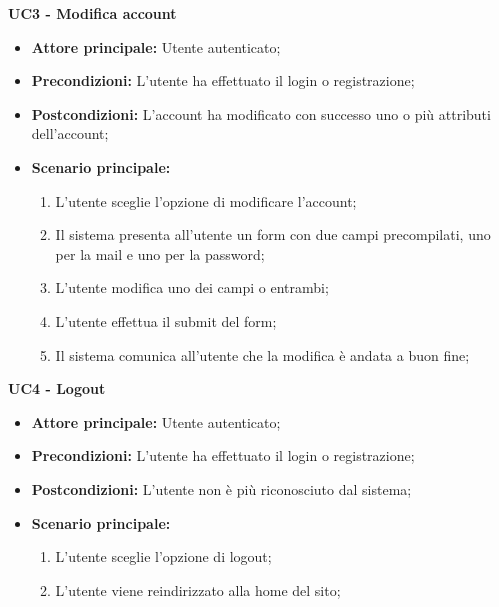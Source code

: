 
\textbf{UC3 - Modifica account}
\begin{itemize}
    \item \textbf{Attore principale: }Utente autenticato;
    \item \textbf{Precondizioni: }L'utente ha effettuato il login o registrazione;
    \item \textbf{Postcondizioni: }L'account ha modificato con successo uno o più attributi dell'account;
    \item \textbf{Scenario principale:} 
        \begin{enumerate}
            \item L'utente sceglie l'opzione di modificare l'account;
            \item Il sistema presenta all'utente un form con due campi precompilati, uno per la mail e uno per la password;
            \item L'utente modifica uno dei campi o entrambi;
            \item L'utente effettua il submit del form;
            \item Il sistema comunica all'utente che la modifica è andata a buon fine;
        \end{enumerate}
\end{itemize}

\textbf{UC4 - Logout}
\begin{itemize}
    \item \textbf{Attore principale: }Utente autenticato;
    \item \textbf{Precondizioni: }L'utente ha effettuato il login o registrazione;
    \item \textbf{Postcondizioni: }L'utente non è più riconosciuto dal sistema;
    \item \textbf{Scenario principale:} 
        \begin{enumerate}
            \item L'utente sceglie l'opzione di logout;
            \item L'utente viene reindirizzato alla home del sito;
        \end{enumerate}
\end{itemize}

